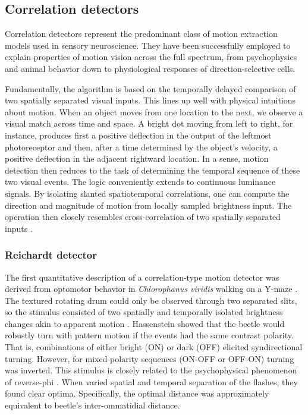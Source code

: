 \subsection{Correlation detectors}

Correlation detectors represent the predominant class of motion extraction models used in sensory neuroscience. They have been successfully employed to explain properties of motion vision across the full spectrum, from psychophysics and animal behavior down to physiological responses of direction-selective cells.

Fundamentally, the algorithm is based on the temporally delayed comparison of two spatially separated visual inputs. This lines up well with physical intuitions about motion. When an object moves from one location to the next, we observe a visual match across time and space. A bright dot moving from left to right, for instance, produces first a positive deflection in the output of the leftmost photoreceptor and then, after a time determined by the object's velocity, a positive deflection in the adjacent rightward location. In a sense, motion detection then reduces to the task of determining the temporal sequence of these two visual events. The logic conveniently extends to continuous luminance signals. By isolating slanted spatiotemporal correlations, one can compute the direction and magnitude of motion from locally sampled brightness input. The operation then closely resembles cross-correlation of two spatially separated inputs \citep{Reichardt:1987uo}.

\subsubsection{Reichardt detector}

The first quantitative description of a correlation-type motion detector was derived from optomotor behavior in \textit{Chlorophanus viridis} walking on a Y-maze \citep{Hassenstein:1951aa}. The textured rotating drum could only be observed through two separated slits, so the stimulus consisted of two spatially and temporally isolated brightness changes akin to apparent motion \citep{Wertheimer:1912aa}. Hassenstein showed that the beetle would robustly turn with pattern motion if the events had the same contrast polarity. That is, combinations of either bright (ON) or dark (OFF) elicited syndirectional turning. However, for mixed-polarity sequences (ON-OFF or OFF-ON) turning was inverted. This stimulus is closely related to the psychophysical phenomenon of reverse-phi \citep{Anstis:1970tv,Anstis:1975tu}. When \citet{Hassenstein:1956fa} varied spatial and temporal separation of the flashes, they found clear optima. Specifically, the optimal distance was approximately equivalent to beetle's inter-ommatidial distance.


